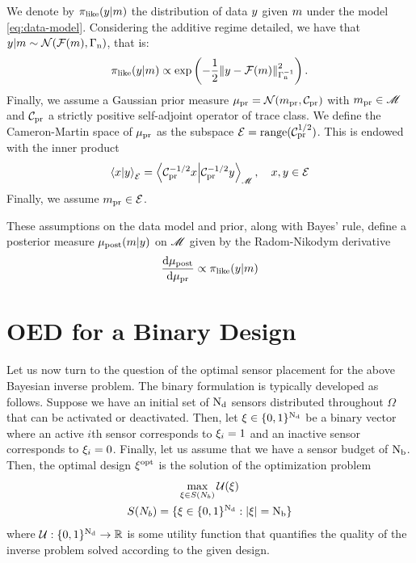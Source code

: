 \documentclass[a4paper,11pt]{article}
\begin{document}
We denote by $\pi_{\rm like}(y | m)$ the distribution of data $y$ given 
$m$ under the model \cref{eq:data-model}. Considering the additive regime
detailed, we have that $y | m \sim \mathcal{N}(\mathcal{F}(m), \Gamma_{\rm n})$, that is:
\begin{equation} \label{eq:likelihood}
  \pi_{\rm like}(y | m) 
  \propto
  \exp \left(
    -\frac{1}{2} \norm{y - \mathcal{F}(m)}_{\Gamma_{\rm n}^{-1}}^2
  \right).
\end{equation}
Finally, we assume a Gaussian prior measure $\mu_{\rm pr} = \mathcal{N}(m_{\rm pr},
\mathcal{C}_{\rm pr})$ with $m_{\rm pr} \in \mathscr{M}$ and $\mathcal{C}_{\rm pr}$ a strictly positive
self-adjoint operator of trace class. We define the Cameron-Martin space of
$\mu_{\rm pr}$ as the subspace $\mathcal{E} = {\rm range}(\mathcal{C}_{\rm pr}^{1/2})$.
This is endowed with the inner product
\begin{equation}
  \label{eq:cameron-martin-inner-product}
  \ip{x}{y}_{\cameronmartin} = \ip{\priorcovinvsqrt x}{\priorcovinvsqrt y}_{\paramspace}
  , \quad x, y \in \cameronmartin
\end{equation}
Finally, we assume $m_{\rm pr} \in \mathcal{E}$.

These assumptions on the data model and prior, along with Bayes' rule, define a
posterior measure $\mu_{\rm post}(m | y)$ on $\mathscr{M}$ given by the
Radom-Nikodym derivative
\begin{equation}\label{eq:bayes}
  \dv{\mu_{\rm post}}{\mu_{\rm pr}}
  \propto \pi_{\rm like}(y | m)
\end{equation}

\section{OED for a Binary Design}
\label{sec:binary-oed}
Let us now turn to the question of the optimal sensor placement for the above Bayesian
inverse problem. The binary formulation is typically developed as follows. Suppose we
have an initial set of ${\rm N_{d}}$ sensors distributed throughout $\Omega$ that can be
activated or deactivated. Then, let $\xi \in \{0, 1\}^{{\rm N_{d}}}$ be a binary vector where
an active $i$th sensor corresponds to $\xi_i = 1$ and an inactive sensor corresponds
to $\xi_i = 0$. Finally, let us assume that we have a sensor budget of ${\rm N_{b}}$.
Then, the optimal design $\xi^{\rm opt}$ is the solution of the optimization problem
\begin{gather}
  \label{eq:binary-oed}
  \max_{\xi \in S(N_b)} \mathcal{U}(\xi)
  \\
  S(N_b) = \{\xi \in \{0, 1\}^{{\rm N_{d}}} : |\xi| = {\rm N_{b}}\}
\end{gather}
where $\mathcal{U}: \{0, 1\}^{{\rm N_{d}}} \to \mathbb{R}$ is some utility function that quantifies the
quality of the inverse problem solved according to the given design. 
\end{document}
